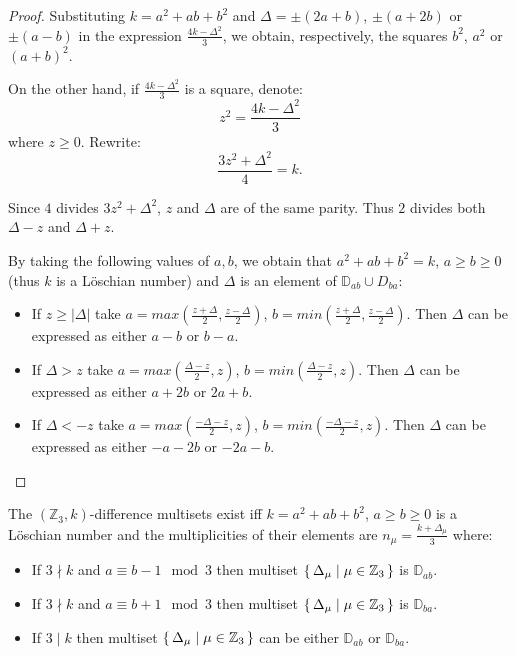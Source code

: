 \begin{proof}
	Substituting $k=a^2+ab+b^2$ and $\Delta=\pm (2a+b)$, $\pm (a+2b)$ or $\pm (a-b)$ in the expression $\frac{4k-\Delta^2}{3}$, we obtain, respectively, the squares $b^2$, $a^2$ or $(a+b)^2$.
	
	On the other hand, if $\frac{4k-\Delta^2}{3}$ is a square, denote:
	\begin{equation}
		z^2 = \frac{4k-\Delta^2}{3}
	\end{equation}
	where $z \geq 0$. Rewrite:
	\begin{equation}
		\frac{3z^2 + \Delta^2}{4} = k.
	\end{equation}
	
	Since $4$ divides $3z^2 + \Delta^2$, $z$ and $\Delta$ are of the same parity. Thus $2$ divides both $\Delta-z$ and $\Delta+z$.
	
	By taking the following values of $a,b$, we obtain that $a^2+ab+b^2=k$, $a \geq b \geq 0$ (thus $k$ is a Löschian number) and $\Delta$ is an element of $\mathbb D_{ab} \cup D_{ba}$:
	
	\begin{itemize}
		\item If $z \geq |\Delta|$ take $a=max(\frac{z+\Delta}2, \frac{z-\Delta}2)$, $b=min(\frac{z+\Delta}2, \frac{z-\Delta}2)$. Then $\Delta$ can be expressed as either $a-b$ or $b-a$.
		\item If $\Delta > z$ take $a=max(\frac{\Delta-z}{2}, z)$, $b=min(\frac{\Delta-z}{2}, z)$. Then $\Delta$ can be expressed as either $a+2b$ or $2a+b$.
		\item If $\Delta < -z$ take $a=max(\frac{-\Delta-z}2, z)$, $b=min(\frac{-\Delta-z}2, z)$. Then $\Delta$ can be expressed as either $-a-2b$ or $-2a-b$.
	\end{itemize}
	
\end{proof}

\begin{theorem}
	\label{v3:theorem:loeschian}
	The $(\mathbb Z_3,k)$-difference multisets exist iff $k=a^2+ab+b^2$, $a \geq b \geq 0$ is a Löschian number and the multiplicities of their elements are $n_\mu=\frac{k+\Delta_\mu}3$ where:
	
	\begin{itemize}
        \item If $3 \nmid k$ and $a \equiv b-1 \mod 3$ then multiset $\set{\Delta_\mu | \mu \in \mathbb Z_3}$ is $\mathbb D_{ab}$.
        \item If $3 \nmid k$ and $a \equiv b+1 \mod 3$ then multiset $\set{\Delta_\mu | \mu \in \mathbb Z_3}$ is $\mathbb D_{ba}$.
        \item If $3 \mid k$ then multiset $\set{\Delta_\mu | \mu \in \mathbb Z_3}$ can be either $\mathbb D_{ab}$ or $\mathbb D_{ba}$.
	\end{itemize}
\end{theorem}


